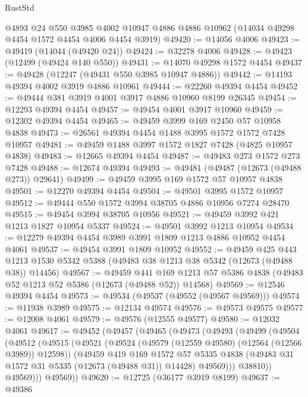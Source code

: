 \begin{lexlean}{RustStd}
\begin{coremodule}
    @4893
    @24
    @550
    @3985
    @4002
    @10947
    @4886
    @4886
    @10962
    (@14034 @49298 @4454 @1572 @4454 @4006 @4454 @3919)
@49420 := @14056 @4006
@49423 := @49419 (@14044 (@49420 @24))
@49424 := @32278 @4006
@49428 := @49423 (@12499 (@49424 @140 @550))
@49431 := @14070 @49298 @1572 @4454
@49437 := @49428 (@12247 (@49431 @550 @3985 @10947 @4886))
@49442 := @14193 @49394 @4002 @3919 @4886 @10961
@49444 := @22260 @49394 @4454
@49452 := @49444 @381 @3919 @4001 @3917 @4886 @10960 @8199 @26345
@49454 := @12293 @49394 @4454
@49457 := @49454 @4001 @3917 @10960
@49459 := @12302 @49394 @4454
@49465 := @49459 @3999 @169 @2450 @57 @10958 @4838
@49473 := @26561 @49394 @4454 @1488 @3995 @1572 @1572 @7428 @10957
@49481 := @49459 @1488 @3997 @1572 @1827 @7428 (@4825 @10957 @4838)
@49483 := @12665 @49394 @4454
@49487 := @49483 @273 @1572 @273 @7428
@49488 := @12674 @49394
@49493 := @49481 (@49487 (@12673 (@49488 @273)) @29641)
@49499 := @49459 @3995 @169 @1572 @57 @10957 @4838
@49501 := @12270 @49394 @4454
@49504 := @49501 @3995 @1572 @10957
@49512 := @49444 @550 @1572 @3994 @38705 @4886 @10956 @7274 @28470
@49515 := @49454 @3994 @38705 @10956
@49521 := @49459 @3992 @421 @1213 @1827 @10954 @5337
@49524 := @49501 @3992 @1213 @10954
@49534 := @12279 @49394 @4454 @3989 @3991 @1809 @1213 @4886 @10952 @4454 @4061
@49537 := @49454 @3991 @1809 @10952
@49552 := @49459
    @425
    @443
    @1213
    @1530
    @5342
    @5388
    (@49483 @38 @1213 @38 @5342 (@12673 (@49488 @38)) @14456)
@49567 := @49459
    @441
    @169
    @1213
    @57
    @5386
    @4838
    (@49483 @52 @1213 @52 @5386 (@12673 (@49488 @52)) @14568)
@49569 := @12546 @49394 @4454
@49573 := @49534 (@49537 (@49552 (@49567 @49569)))
@49574 := @11938 @3989
@49575 := @12134 @49574
@49576 := @49573 @49575
@49577 := @12008 @4061
@49579 := @49576 (@12555 @49577)
@49580 := @12032 @4061
@49617 := @49452
    (@49457
      (@49465
        (@49473
          (@49493
            (@49499
              (@49504
                (@49512
                  (@49515
                    (@49521
                      (@49524 (@49579 (@12559 @49580) (@12564 (@12566 @3989)) @12598))
                      (@49459
                        @419
                        @169
                        @1572
                        @57
                        @5335
                        @4838
                        (@49483 @31 @1572 @31 @5335 (@12673 (@49488 @31)) @14428)
                        @49569)))
                  @38810))
              @49569)))
        @49569))
@49620 := @12725 (@36177 @3919 @8199)
@49637 := @49386

\end{coremodule}
\end{lexlean}
